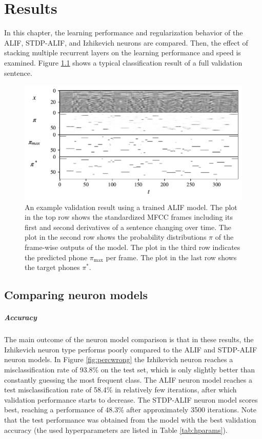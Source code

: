 \chapter{Results}\label{ch:results}
In this chapter, the learning performance and regularization behavior of the ALIF, STDP-ALIF, and Izhikevich neurons are compared.
Then, the effect of stacking multiple recurrent layers on the learning performance and speed is examined.
Figure \ref{fig:inoutpair} shows a typical classification result of a full validation sentence.

	\begin{figure}[ht]
	    \myfloatalign
	    \includegraphics[width=\linewidth]{gfx/InOutPair}
	    \caption[Input/output/target example]{An example validation result using a trained ALIF model. The plot in the top row shows the standardized MFCC frames including its first and second derivatives of a sentence changing over time. The plot in the second row shows the probability distributions $\pi$ of the frame-wise outputs of the model. The plot in the third row indicates the predicted phone $\pi_\text{max}$ per frame. The plot in the last row shows the target phones $\pi^*$.}
	    \label{fig:inoutpair}
	  \end{figure}

\section{Comparing neuron models}
	\paragraph{Accuracy}
		The main outcome of the neuron model comparison is that in these results, the Izhikevich neuron type performs poorly compared to the ALIF and STDP-ALIF neuron models.
		In Figure \ref{fig:percwrong} the Izhikevich neuron reaches a misclassification rate of 93.8\% on the test set, which is only slightly better than constantly guessing the most frequent class.
		The ALIF neuron model reaches a test misclassification rate of 58.4\% in relatively few iterations, after which validation performance starts to decrease.
		The STDP-ALIF neuron model scores best, reaching a performance of 48.3\% after approximately 3500 iterations.
		Note that the test performance was obtained from the model with the best validation accuracy (the used hyperparameters are listed in Table \ref{tab:hparams}).

